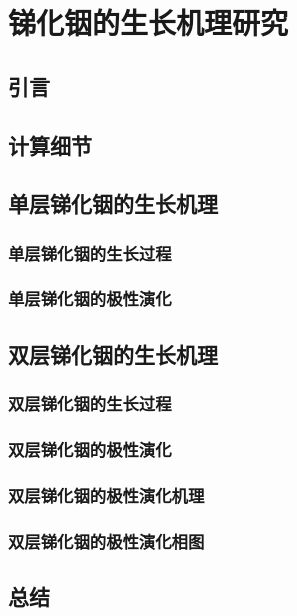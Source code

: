 \chapter{锑化铟的生长机理研究}
\section{引言}
\section{计算细节}
\section{单层锑化铟的生长机理}
    \subsection{单层锑化铟的生长过程}
    \subsection{单层锑化铟的极性演化}
\section{双层锑化铟的生长机理}
    \subsection{双层锑化铟的生长过程}
    \subsection{双层锑化铟的极性演化}
    \subsection{双层锑化铟的极性演化机理}
    \subsection{双层锑化铟的极性演化相图}
\section{总结}